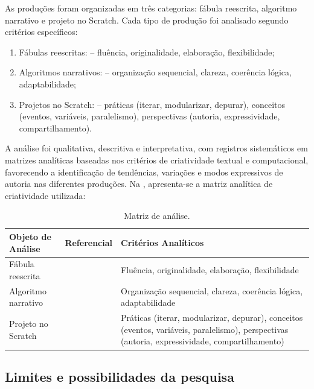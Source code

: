 \documentclass[portuguese]{textolivre}
\begin{document}
As produções foram organizadas em três categorias: fábula reescrita, algoritmo narrativo e projeto no Scratch. Cada tipo de produção foi analisado segundo critérios específicos:

\begin{enumerate}[label=\alph*)]
\item	Fábulas reescritas: \textcite{torrance1995} – fluência, originalidade, elaboração, flexibilidade;
\item	Algoritmos narrativos: \textcite{cieb2024} – organização sequencial, clareza, coerência lógica, adaptabilidade;
\item	Projetos no Scratch: \textcite{brennan2012} – práticas (iterar, modularizar, depurar), conceitos (eventos, variáveis, paralelismo), perspectivas (autoria, expressividade, compartilhamento).
\end{enumerate}

A análise foi qualitativa, descritiva e interpretativa, com registros sistemáticos em matrizes analíticas baseadas nos critérios de criatividade textual e computacional, favorecendo a identificação de tendências, variações e modos expressivos de autoria nas diferentes produções. Na , apresenta-se a matriz analítica de criatividade utilizada:

\begin{table}[ht]
\centering
\caption{Matriz de análise.}
\label{quadro:matriz}

\begin{tabular}{p{3.5cm}p{3.5cm}p{6.5cm}}
\toprule
Objeto de Análise & Referencial & Critérios Analíticos \\
\midrule
Fábula reescrita & \textcite{torrance1995} & Fluência, originalidade, elaboração, flexibilidade \\
Algoritmo narrativo & \textcite{cieb2024} & Organização sequencial, clareza, coerência lógica, adaptabilidade \\
Projeto no Scratch & \textcite{brennan2012} & Práticas (iterar, modularizar, depurar), conceitos (eventos, variáveis, paralelismo), perspectivas (autoria, expressividade, compartilhamento) \\
\bottomrule
\end{tabular}

\vspace{0.3cm}
\end{table}

\subsection{Limites e possibilidades da pesquisa}
\end{document}
